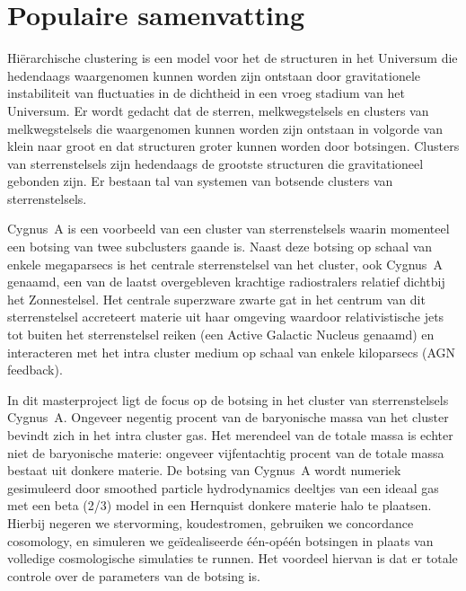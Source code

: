 \documentclass[MScProj_TLRH_ClusterEnergy.tex]{subfiles}
\begin{document}
\chapter*{Populaire samenvatting}


Hi\"erarchische clustering is een model voor het de structuren in het Universum
die hedendaags waargenomen kunnen worden zijn ontstaan door gravitationele
instabiliteit van fluctuaties in de dichtheid in een vroeg stadium van het
Universum. Er wordt gedacht dat de sterren, melkwegstelsels en clusters van
melkwegstelsels die waargenomen kunnen worden zijn ontstaan in volgorde van
klein naar groot en dat structuren groter kunnen worden door botsingen. Clusters
van sterrenstelsels zijn hedendaags de grootste structuren die gravitationeel
gebonden zijn. Er bestaan tal van systemen van botsende clusters van
sterrenstelsels.


Cygnus~A is een voorbeeld van een cluster van sterrenstelsels waarin momenteel
een botsing van twee subclusters gaande is. Naast deze botsing op schaal van
enkele megaparsecs is het centrale sterrenstelsel van het cluster, ook Cygnus~A
genaamd, een van de laatst overgebleven krachtige radiostralers relatief
dichtbij het Zonnestelsel. Het centrale superzware zwarte gat in het centrum van
dit sterrenstelsel accreteert materie uit haar omgeving waardoor relativistische
jets tot buiten het sterrenstelsel reiken (een Active Galactic Nucleus genaamd)
en interacteren met het intra cluster medium op schaal van enkele kiloparsecs
(AGN feedback).

In dit masterproject ligt de focus op de botsing in het cluster van
sterrenstelsels Cygnus~A. Ongeveer negentig procent van de baryonische massa van
het cluster bevindt zich in het intra cluster gas. Het merendeel van de totale
massa is echter niet de baryonische materie: ongeveer vijfentachtig procent van
de totale massa bestaat uit donkere materie. De botsing van Cygnus~A wordt
numeriek gesimuleerd door smoothed particle hydrodynamics deeltjes van een
ideaal gas met een beta (2/3) model in een Hernquist donkere materie halo te
plaatsen. Hierbij negeren we stervorming, koudestromen, gebruiken we concordance
cosomology, en simuleren we ge\"idealiseerde \'e\'en-op\'e\'en botsingen in plaats van volledige cosmologische simulaties te runnen. Het voordeel hiervan is dat er totale controle over de parameters van de botsing is.
\end{document}
